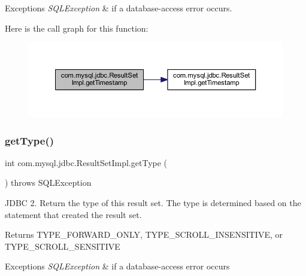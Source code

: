 \begin{DoxyExceptions}{Exceptions}
{\em S\+Q\+L\+Exception} & if a database-\/access error occurs. \\
\hline
\end{DoxyExceptions}
Here is the call graph for this function\+:
\nopagebreak
\begin{figure}[H]
\begin{center}
\leavevmode
\includegraphics[width=350pt]{classcom_1_1mysql_1_1jdbc_1_1_result_set_impl_aea1f8033f50dc70c022687e65fe1b570_cgraph}
\end{center}
\end{figure}
\mbox{\label{classcom_1_1mysql_1_1jdbc_1_1_result_set_impl_a66b98332ec7fdf8c908bb4118d6097d1}} 
\subsubsection{\texorpdfstring{get\+Type()}{getType()}}
{\footnotesize\ttfamily int com.\+mysql.\+jdbc.\+Result\+Set\+Impl.\+get\+Type (\begin{DoxyParamCaption}{ }\end{DoxyParamCaption}) throws S\+Q\+L\+Exception}

J\+D\+BC 2. Return the type of this result set. The type is determined based on the statement that created the result set.

\begin{DoxyReturn}{Returns}
T\+Y\+P\+E\+\_\+\+F\+O\+R\+W\+A\+R\+D\+\_\+\+O\+N\+LY, T\+Y\+P\+E\+\_\+\+S\+C\+R\+O\+L\+L\+\_\+\+I\+N\+S\+E\+N\+S\+I\+T\+I\+VE, or T\+Y\+P\+E\+\_\+\+S\+C\+R\+O\+L\+L\+\_\+\+S\+E\+N\+S\+I\+T\+I\+VE
\end{DoxyReturn}

\begin{DoxyExceptions}{Exceptions}
{\em S\+Q\+L\+Exception} & if a database-\/access error occurs \\
\hline
\end{DoxyExceptions}
\mbox{\label{classcom_1_1mysql_1_1jdbc_1_1_result_set_impl_ae1fb89a978f6a70882bb7305f8266234}} 
